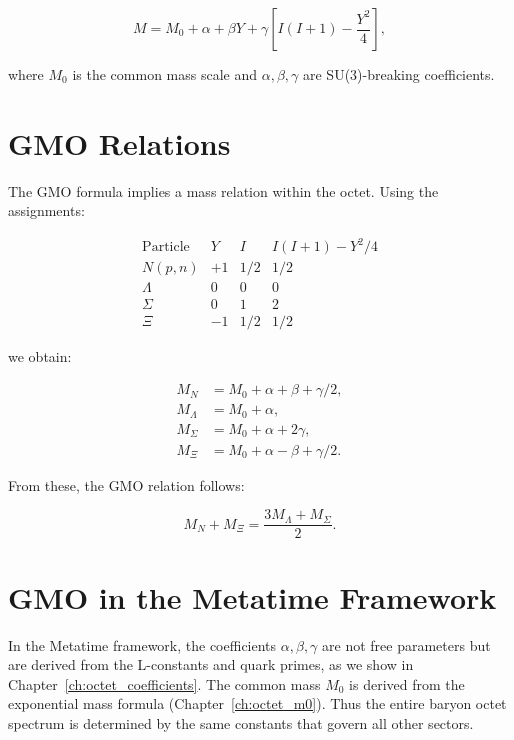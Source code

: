 \[
M = M_0 + \alpha + \beta Y + \gamma\left[I(I+1) - \frac{Y^2}{4}\right],
\label{eq:gmo_metatime}
\]

where \(M_0\) is the common mass scale and \(\alpha, \beta, \gamma\) are
SU(3)-breaking coefficients.

\section{GMO Relations}

The GMO formula implies a mass relation within the octet.  Using the
assignments:

\[
\begin{array}{lccc}
\text{Particle} & Y & I & I(I+1) - Y^2/4 \\
\hline
N (p,n) & +1 & 1/2 & 1/2 \\
\Lambda & 0 & 0 & 0 \\
\Sigma & 0 & 1 & 2 \\
\Xi & -1 & 1/2 & 1/2
\end{array}
\]

we obtain:

\[
\begin{aligned}
M_N &= M_0 + \alpha + \beta + \gamma/2, \\
M_\Lambda &= M_0 + \alpha, \\
M_\Sigma &= M_0 + \alpha + 2\gamma, \\
M_\Xi &= M_0 + \alpha - \beta + \gamma/2.
\end{aligned}
\]

From these, the GMO relation follows:

\[
M_N + M_\Xi = \frac{3M_\Lambda + M_\Sigma}{2}.
\]

\section{GMO in the Metatime Framework}

In the Metatime framework, the coefficients \(\alpha, \beta, \gamma\) are not
free parameters but are derived from the L-constants and quark primes, as we
show in Chapter~\ref{ch:octet_coefficients}.  The common mass \(M_0\) is
derived from the exponential mass formula (Chapter~\ref{ch:octet_m0}).
Thus the entire baryon octet spectrum is determined by the same constants
that govern all other sectors.
